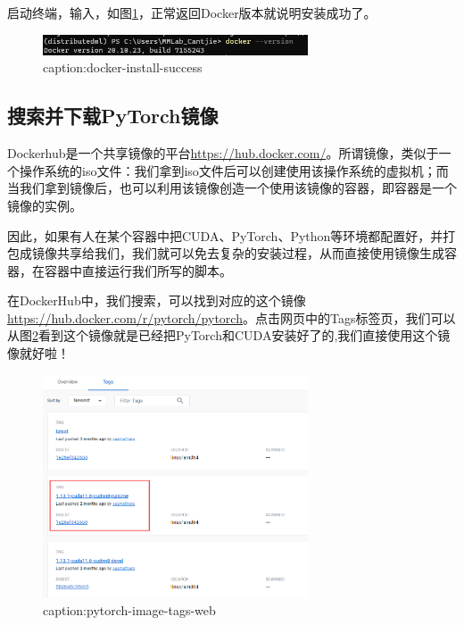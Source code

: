 启动终端，输入，如图\ref{fig:docker-install-success}，正常返回Docker版本就说明安装成功了。
\begin{figure}[htbp]
	\centering
	\includegraphics[width=0.7\textwidth]{figures/docker-install-success.png}
	\caption{caption:docker-install-success}
	\label{fig:docker-install-success}
\end{figure}


\subsection{搜索并下载PyTorch镜像}

Dockerhub是一个共享镜像的平台\url{https://hub.docker.com/}。所谓镜像，类似于一个操作系统的iso文件：我们拿到iso文件后可以创建使用该操作系统的虚拟机；而当我们拿到镜像后，也可以利用该镜像创造一个使用该镜像的容器，即容器是一个镜像的实例。

因此，如果有人在某个容器中把CUDA、PyTorch、Python等环境都配置好，并打包成镜像共享给我们，我们就可以免去复杂的安装过程，从而直接使用镜像生成容器，在容器中直接运行我们所写的脚本。

在DockerHub中，我们搜索，可以找到对应的这个镜像\url{https://hub.docker.com/r/pytorch/pytorch}。点击网页中的Tags标签页，我们可以从图\ref{fig:pytorch-image-tags-web}看到这个镜像就是已经把PyTorch和CUDA安装好了的,我们直接使用这个镜像就好啦！

\begin{figure}[htbp]
	\centering
	\includegraphics[width=0.7\textwidth]{figures/pytorch-image-tags-web.png}
	\caption{caption:pytorch-image-tags-web}
	\label{fig:pytorch-image-tags-web}
\end{figure}

